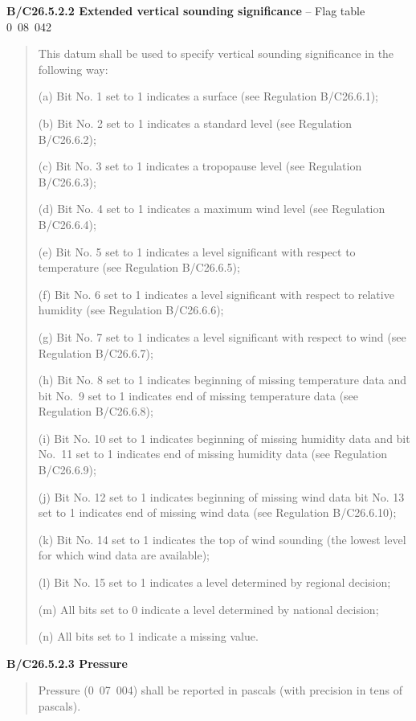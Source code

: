 \textbf{B/C26.5.2.2 Extended vertical sounding significance} -- Flag table 0~08~042

\begin{quote}
This datum shall be used to specify vertical sounding significance in the following way:

(a) Bit No. 1 set to 1 indicates a surface (see Regulation B/C26.6.1);

(b) Bit No. 2 set to 1 indicates a standard level (see Regulation B/C26.6.2);

(c) Bit No. 3 set to 1 indicates a tropopause level (see Regulation B/C26.6.3);

(d) Bit No. 4 set to 1 indicates a maximum wind level (see Regulation B/C26.6.4);

(e) Bit No. 5 set to 1 indicates a level significant with respect to temperature (see Regulation B/C26.6.5);

(f) Bit No. 6 set to 1 indicates a level significant with respect to relative humidity (see Regulation B/C26.6.6);

(g) Bit No. 7 set to 1 indicates a level significant with respect to wind (see Regulation B/C26.6.7);

(h) Bit No. 8 set to 1 indicates beginning of missing temperature data and bit No.~9 set to 1 indicates end of missing temperature data (see Regulation B/C26.6.8);

(i) Bit No. 10 set to 1 indicates beginning of missing humidity data and bit No.~11 set to 1 indicates end of missing humidity data (see Regulation B/C26.6.9);

(j) Bit No. 12 set to 1 indicates beginning of missing wind data bit No. 13 set to 1 indicates end of missing wind data (see Regulation B/C26.6.10);

(k) Bit No. 14 set to 1 indicates the top of wind sounding (the lowest level for which wind data are available);

(l) Bit No. 15 set to 1 indicates a level determined by regional decision;

(m) All bits set to 0 indicate a level determined by national decision;

(n) All bits set to 1 indicate a missing value.
\end{quote}

\textbf{B/C26.5.2.3 Pressure}

\begin{quote}
Pressure (0~07~004) shall be reported in pascals (with precision in tens of pascals).
\end{quote}

